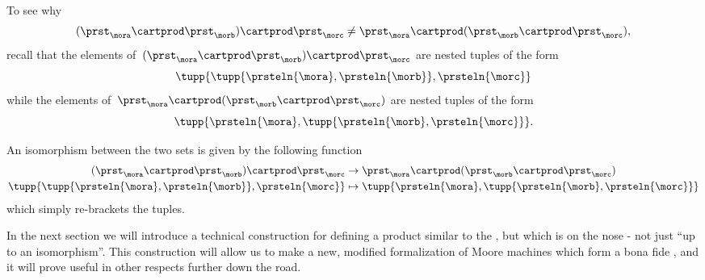 To see why
\begin{equation}
    \label{eq:assoc-fails1}
    (\prst_{\mora} \cartprod \prst_{\morb}) \cartprod \prst_{\morc} \neq \prst_{\mora} \cartprod (\prst_{\morb} \cartprod \prst_{\morc}),
\end{equation}
recall that the elements of~$(\prst_{\mora} \cartprod \prst_{\morb}) \cartprod \prst_{\morc}$ are nested tuples of the form
\begin{equation}
    \tupp{ \tupp{\prsteln{\mora}, \prsteln{\morb}}, \prsteln{\morc} }
\end{equation}
while the elements of~$\prst_{\mora} \cartprod (\prst_{\morb} \cartprod \prst_{\morc})$ are nested tuples of the form
\begin{equation}
    \tupp{\prsteln{\mora}, \tupp{\prsteln{\morb}, \prsteln{\morc}} }.
\end{equation}

An isomorphism between the two sets is given by the following function
\begin{equation}
    \label{eq:assoc-fails2}
    \begin{aligned}
        (\prst_{\mora} \cartprod \prst_{\morb})
        \cartprod \prst_{\morc}                                           & \to \prst_{\mora} \cartprod (\prst_{\morb} \cartprod \prst_{\morc}) \\
        \tupp{ \tupp{\prsteln{\mora}, \prsteln{\morb}}, \prsteln{\morc} } & \mapsto \tupp{\prsteln{\mora}, \tupp{\prsteln{\morb}, \prsteln{\morc}} }
    \end{aligned}
\end{equation}
which simply re-brackets the tuples.

In the next section we will introduce a technical construction for defining a product similar to the , but which is  on the nose - not just ``up to an isomorphism''.
This construction will allow us to make a new, modified formalization of Moore machines which form a bona fide , and it will prove useful in other respects further down the road.

